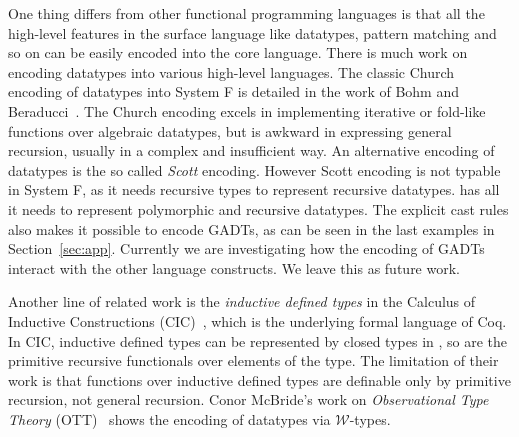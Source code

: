 One thing \name differs from other functional programming languages is that all the high-level features in the surface language like datatypes, pattern matching and so on can be easily encoded into the core language. There is much work on encoding datatypes into various high-level languages. The classic Church encoding of datatypes into System F is detailed in the work of Bohm and Beraducci~\cite{Bohm1985}. The Church encoding excels in implementing iterative or fold-like functions over algebraic datatypes, but is awkward in expressing general recursion, usually in a complex and insufficient way. An alternative encoding of datatypes is the so called \emph{Scott} encoding. However Scott encoding is not typable in System F, as it needs recursive types to represent recursive datatypes. \name has all it needs to represent polymorphic and recursive datatypes. The explicit cast rules also makes it possible to encode GADTs, as can be seen in the last examples in Section~\ref{sec:app}. Currently we are investigating how the encoding of GADTs interact with the other language constructs. We leave this as future work.

Another line of related work is the \emph{inductive defined types} in
the Calculus of Inductive Constructions (CIC)~\cite{cic}, which is the
underlying formal language of Coq. In CIC, inductive defined types can
be represented by closed types in \coc, so are the primitive recursive
functionals over elements of the type. The limitation of their work is
that functions over inductive defined types are definable only by
primitive recursion, not general recursion. Conor McBride's work on
\emph{Observational Type Theory} (OTT)~\cite{ott} shows the encoding
of datatypes via $\mathcal{W}$-types.

 




